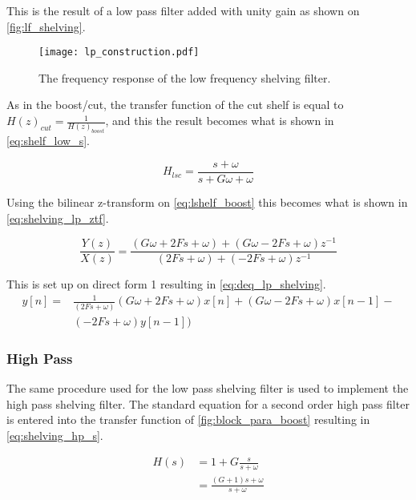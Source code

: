 This is the result of a low pass filter added with unity gain as shown on \autoref{fig:lf_shelving}.
 
\begin{figure}[htbp]
    \centering
    \texttt{[image: lp\_construction.pdf]}
    \caption{The frequency response of the low frequency shelving filter.}
    \label{fig:lf_shelving}
\end{figure}

As in the boost/cut, the transfer function of the cut shelf is equal to $ {H(z)}_{cut} = \frac{1}{{H(z)}_{boost}} $, and this the result becomes what is shown in \autoref{eq:shelf_low_s}.

\begin{equation}\label{eq:shelf_low_s}
H_{lsc}=\frac{s+\omega}{s+G\omega+\omega}
\end{equation}

Using the bilinear z-transform on \autoref{eq:lshelf_boost} this becomes what is shown in \autoref{eq:shelving_lp_ztf}.

\begin{equation}\label{eq:shelving_lp_ztf}
\frac{Y(z)}{X(z)}=\frac{(G\omega+2Fs+\omega)+(G\omega-2Fs+\omega)z^{-1}}{(2Fs+\omega)+(-2Fs+\omega)z^{-1}}
\end{equation}

This is set up on direct form 1 resulting in \autoref{eq:deq_lp_shelving}.
\begin{equation}\label{eq:deq_lp_shelving}
\begin{split}
y[n]=&\frac{1}{(2Fs+\omega)}(G\omega+2Fs+\omega) x[n]+(G\omega-2Fs+\omega)x[n-1] -\\
&(-2Fs+\omega)y[n-1])
\end{split}
\end{equation}

\subsubsection{High Pass}
The same procedure used for the low pass shelving filter is used to implement the high pass shelving filter. The standard equation for a second order high pass filter is entered into the transfer function of \autoref{fig:block_para_boost} resulting in \autoref{eq:shelving_hp_s}.


\begin{equation}\label{eq:shelving_hp_s}
\begin{split}
	H(s)&=1+G\frac{s}{s+\omega}\\
	&=\frac{(G+1)s+\omega}{s+\omega}
\end{split}
\end{equation}


